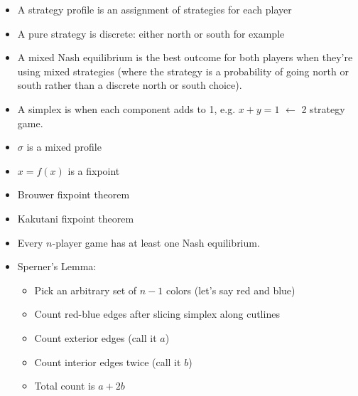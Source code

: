 \documentclass{article}
\begin{document}
\begin{itemize}
  \item A strategy profile is an assignment of strategies for each player
  \item A pure strategy is discrete: either north or south for example
  \item A mixed Nash equilibrium is the best outcome for both players when they're using mixed strategies (where the strategy is a probability of going north or south rather than a discrete north or south choice).
  \item A simplex is when each component adds to 1, e.g. $x+y=1$ $\leftarrow$ 2 strategy game.
  \item $\sigma$ is a mixed profile
  \item $x=f(x)$ is a fixpoint
  \item Brouwer fixpoint theorem
  \item Kakutani fixpoint theorem
  \item Every $n$-player game has at least one Nash equilibrium.
  \item Sperner's Lemma:
    \begin{itemize}
      \item Pick an arbitrary set of $n-1$ colors (let’s say red and blue)
      \item Count red-blue edges after slicing simplex along cutlines
      \item Count exterior edges (call it $a$)
      \item Count interior edges twice (call it $b$)
      \item Total count is $a + 2b$
    \end{itemize}
\end{itemize}
\end{document}

